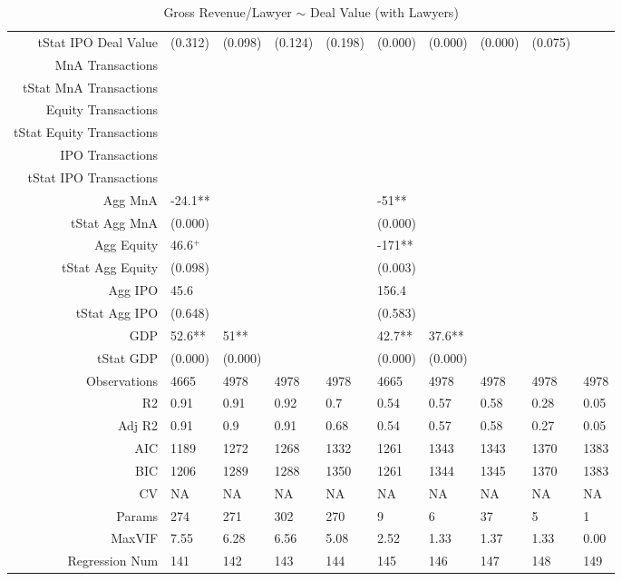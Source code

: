 \begin{table}[ht]
\begin{tabular}{rlllllllll}
  tStat IPO Deal Value & (0.312) & (0.098) & (0.124) & (0.198) & (0.000) & (0.000) & (0.000) & (0.075) &  \\ 
  MnA Transactions &  &  &  &  &  &  &  &  &  \\ 
  tStat MnA Transactions &  &  &  &  &  &  &  &  &  \\ 
  Equity Transactions &  &  &  &  &  &  &  &  &  \\ 
  tStat Equity Transactions &  &  &  &  &  &  &  &  &  \\ 
  IPO Transactions &  &  &  &  &  &  &  &  &  \\ 
  tStat IPO Transactions &  &  &  &  &  &  &  &  &  \\ 
  Agg MnA & -24.1** &  &  &  & -51** &  &  &  &  \\ 
  tStat Agg MnA & (0.000) &  &  &  & (0.000) &  &  &  &  \\ 
  Agg Equity & 46.6$^{+}$ &  &  &  & -171** &  &  &  &  \\ 
  tStat Agg Equity & (0.098) &  &  &  & (0.003) &  &  &  &  \\ 
  Agg IPO & 45.6 &  &  &  & 156.4 &  &  &  &  \\ 
  tStat Agg IPO & (0.648) &  &  &  & (0.583) &  &  &  &  \\ 
  GDP & 52.6** & 51** &  &  & 42.7** & 37.6** &  &  &  \\ 
  tStat GDP & (0.000) & (0.000) &  &  & (0.000) & (0.000) &  &  &  \\ 
  Observations & 4665 & 4978 & 4978 & 4978 & 4665 & 4978 & 4978 & 4978 & 4978 \\ 
  R2 & 0.91 & 0.91 & 0.92 & 0.7 & 0.54 & 0.57 & 0.58 & 0.28 & 0.05 \\ 
  Adj R2 & 0.91 & 0.9 & 0.91 & 0.68 & 0.54 & 0.57 & 0.58 & 0.27 & 0.05 \\ 
  AIC & 1189 & 1272 & 1268 & 1332 & 1261 & 1343 & 1343 & 1370 & 1383 \\ 
  BIC & 1206 & 1289 & 1288 & 1350 & 1261 & 1344 & 1345 & 1370 & 1383 \\ 
  CV & NA & NA & NA & NA & NA & NA & NA & NA & NA \\ 
  Params & 274 & 271 & 302 & 270 & 9 & 6 & 37 & 5 & 1 \\ 
  MaxVIF & 7.55 & 6.28 & 6.56 & 5.08 & 2.52 & 1.33 & 1.37 & 1.33 & 0.00 \\ 
  Regression Num & 141 & 142 & 143 & 144 & 145 & 146 & 147 & 148 & 149 \\ 
   \hline
\end{tabular}
\caption{Gross Revenue/Lawyer $\sim$ Deal Value (with Lawyers)} 
\end{table}
